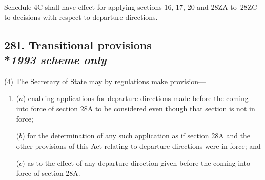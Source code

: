 \documentclass[12pt,a4paper]{article}
\begin{document}
Schedule 4C shall have effect for applying sections 16, 17, 20 and 28ZA to~28ZC to decisions with respect to departure directions.


\subsection[28I. Transitional provisions --- \emph{1993 scheme only}]{28I. Transitional provisions\\*\emph{1993 scheme only}}

%
%
%

(4) The Secretary of State may by regulations make provision—
\begin{enumerate}\item[]
($a$) enabling applications for departure directions made before the coming into force of section 28A to be considered even though that section is not in force;

($b$) for the determination of any such application as if section 28A and the other provisions of this Act relating to departure directions were in force; and

($c$) as to the effect of any departure direction given before the coming into force of section 28A.
\end{enumerate}
\end{document}

